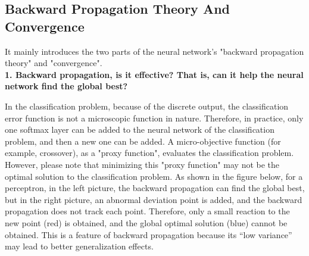 \documentclass{article}
\begin{document}
	\subsection{Backward Propagation Theory And Convergence}
	
	It mainly introduces the two parts of the neural network's "backward propagation theory" and "convergence". \\
	
	\textbf{1. Backward propagation, is it effective? That is, can it help the neural network find the global best?}
	
	In the classification problem, because of the discrete output, the classification error function is not a microscopic function in nature. Therefore, in practice, only one softmax layer can be added to the neural network of the classification problem, and then a new one can be added. A micro-objective function (for example, crossover), as a "proxy function", evaluates the classification problem. However, please note that minimizing this "proxy function" may not be the optimal solution to the classification problem. As shown in the figure below, for a perceptron, in the left picture, the backward propagation can find the global best, but in the right picture, an abnormal deviation point is added, and the backward propagation does not track each point. Therefore, only a small reaction to the new point (red) is obtained, and the global optimal solution (blue) cannot be obtained. This is a feature of backward propagation because its “low variance” may lead to better generalization effects.
	
\end{document}
